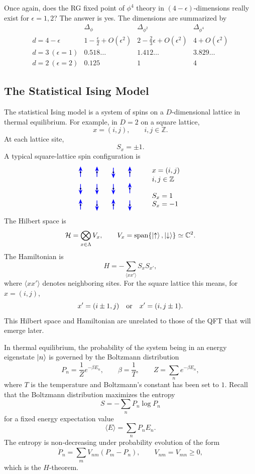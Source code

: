 Once again, does the RG fixed point of \(\phi^4\) theory in
\((4-\epsilon)\)-dimensions really exist for \(\epsilon=1,2\)?  The answer is
yes.  The dimensions are summarized by
\[
\begin{array}{c|ccc}
  & \Delta_\phi & \Delta_{\phi^2} & \Delta_{\phi^4}
\\ \hline
  d=4-\epsilon
  & 1-\frac{\epsilon}{2}+O(\epsilon^2)
  & 2-\frac{2}{3}\epsilon+O(\epsilon^2)
  & 4+O(\epsilon^2)
\\
  d=3\ (\epsilon=1)
  & 0.518\ldots
  & 1.412\ldots
  & 3.829\ldots
\\
  d=2\ (\epsilon=2)
  & 0.125
  & 1
  & 4
\end{array}
\]

\subsection{The Statistical Ising Model}

The statistical Ising model is a system of spins on a \(D\)-dimensional
lattice in thermal equilibrium.  For example, in \(D=2\) on a square lattice,
\[
  x=(i,j),\qquad i,j\in\mathbb Z.
\]
At each lattice site,
\[
  S_x=\pm1.
\]
A typical square-lattice spin configuration is
\[
\begin{tikzpicture}[>=Stealth,scale=0.82,baseline=(current bounding box.center)]
  \foreach \x/\y/\s in {
    0/2/1,1/2/1,2/2/-1,3/2/1,
    0/1/-1,1/1/-1,2/1/-1,3/1/1,
    0/0/1,1/0/-1,2/0/1,3/0/-1}
  {
    \fill (\x,\y) circle (1.4pt);
    \draw[blue,->,line width=0.9pt] (\x,{\y-0.28*\s}) -- (\x,{\y+0.36*\s});
  }
  \node[anchor=west] at (4.2,2.1) {\(x=(i,j)\)};
  \node[anchor=west] at (4.2,1.55) {\(i,j\in\mathbb Z\)};
  \node[anchor=west] at (4.2,0.55) {\(S_x=1\)};
  \node[anchor=west] at (4.2,0.05) {\(S_x=-1\)};
\end{tikzpicture}
\]
The Hilbert space is
\[
  \mathcal H=\bigotimes_{x\in\Lambda}V_x,
  \qquad
  V_x=\operatorname{span}\{\ket{\uparrow},\ket{\downarrow}\}\simeq\mathbb C^2.
\]
The Hamiltonian is
\[
  H=-\sum_{\langle xx'\rangle}S_xS_{x'},
\]
where \(\langle xx'\rangle\) denotes neighboring sites.  For the square
lattice this means, for \(x=(i,j)\),
\[
  x'=(i\pm1,j)\quad\hbox{or}\quad x'=(i,j\pm1).
\]
This Hilbert space and Hamiltonian are unrelated to those of the QFT that
will emerge later.

In thermal equilibrium, the probability of the system being in an energy
eigenstate \(\ket n\) is governed by the Boltzmann distribution
\[
  P_n=\frac{1}{Z}e^{-\beta E_n},
  \qquad
  \beta=\frac{1}{T},
  \qquad
  Z=\sum_n e^{-\beta E_n},
\]
where \(T\) is the temperature and Boltzmann's constant has been set to \(1\).
Recall that the Boltzmann distribution maximizes the entropy
\[
  S=-\sum_n P_n\log P_n
\]
for a fixed energy expectation value
\[
  \langle E\rangle=\sum_n P_nE_n.
\]
The entropy is non-decreasing under probability evolution of the form
\[
  \dot P_n=\sum_m V_{nm}(P_m-P_n),
  \qquad
  V_{nm}=V_{mn}\geq0,
\]
which is the \(H\)-theorem.

